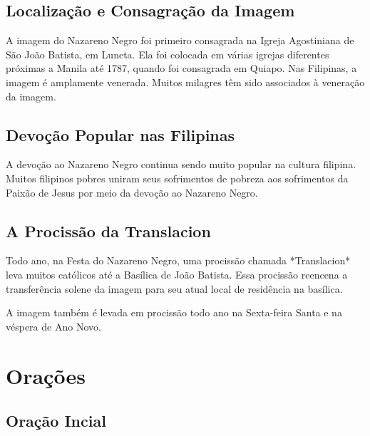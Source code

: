 \documentclass[18pt]{article}
\begin{document}
\begin{justify}
\subsection{Localização e Consagração da Imagem}

\hspace{.45cm} A imagem do Nazareno Negro foi primeiro consagrada na Igreja Agostiniana de São João Batista, em Luneta. Ela foi colocada em várias igrejas diferentes próximas a Manila até 1787, quando foi consagrada em Quiapo. Nas Filipinas, a imagem é amplamente venerada. Muitos milagres têm sido associados à veneração da imagem.


\subsection{Devoção Popular nas Filipinas}

\hspace{.45cm} A devoção ao Nazareno Negro continua sendo muito popular na cultura filipina. Muitos filipinos pobres uniram seus sofrimentos de pobreza aos sofrimentos da Paixão de Jesus por meio da devoção ao Nazareno Negro.


\subsection{A Procissão da Translacion}

\hspace{.45cm} Todo ano, na Festa do Nazareno Negro, uma procissão chamada *Translacion* leva muitos católicos até a Basílica de João Batista. Essa procissão reencena a transferência solene da imagem para seu atual local de residência na basílica.

A imagem também é levada em procissão todo ano na Sexta-feira Santa e na véspera de Ano Novo.


\end{justify}


\newpage
\section{Orações}\label{sec:Orações} %
\subsection{Oração Incial}\label{sec:Oração_Inicial} %
\end{document}
